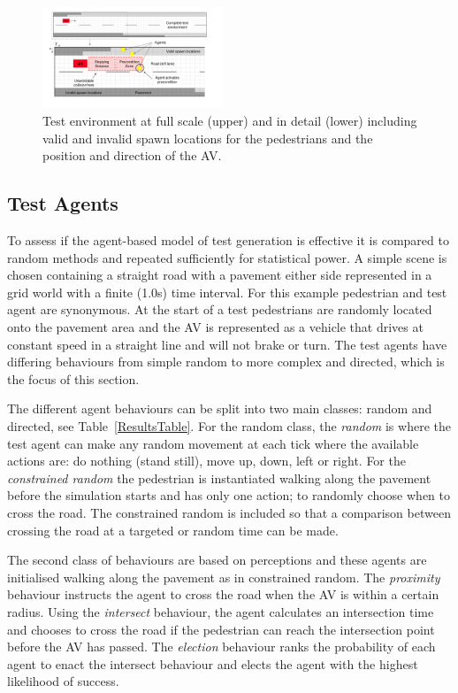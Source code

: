 \documentclass[letterpaper, 10 pt, journal, twoside]{IEEEtran}
\begin{document}
\begin{figure}[!t]
	\centering
\includegraphics[width=0.48\textwidth]{RoadLayout.pdf}
	\caption{Test environment at full scale (upper) and in detail (lower) including valid and invalid spawn locations for the pedestrians and the position and direction of the AV.}
	\label{gridRoad}
\end{figure}


\subsection{Test Agents}
To assess if the agent-based model of test generation is effective it is compared to random methods and repeated sufficiently for statistical power. A simple scene is chosen containing a straight road with a pavement either side represented in a grid world with a finite (1.0s) time interval. For this example pedestrian and test agent are synonymous. At the start of a test pedestrians are randomly located onto the pavement area and the AV is represented as a vehicle that drives at constant speed in a straight line and will not brake or turn. The test agents have differing behaviours from simple random to more complex and directed, which is the focus of this section. 

The different agent behaviours can be split into two main classes: random and directed, see Table~\ref{ResultsTable}. For the random class, the \textit{random} is where the test agent can make any random movement at each tick where the available actions are: do nothing (stand still), move up, down, left or right. For the \textit{constrained random} the pedestrian is instantiated walking along the pavement before the simulation starts and has only one action; to randomly choose when to cross the road. The constrained random is included so that a comparison between crossing the road at a targeted or random time can be made. 

The second class of behaviours are based on perceptions and these agents are initialised walking along the pavement as in constrained random. The \textit{proximity} behaviour instructs the agent to cross the road when the AV is within a certain radius. Using the \textit{intersect} behaviour, the agent calculates an intersection time and chooses to cross the road if the pedestrian can reach the intersection point before the AV has passed. The \textit{election} behaviour ranks the probability of each agent to enact the intersect behaviour and elects the agent with the highest likelihood of success.
\end{document}
